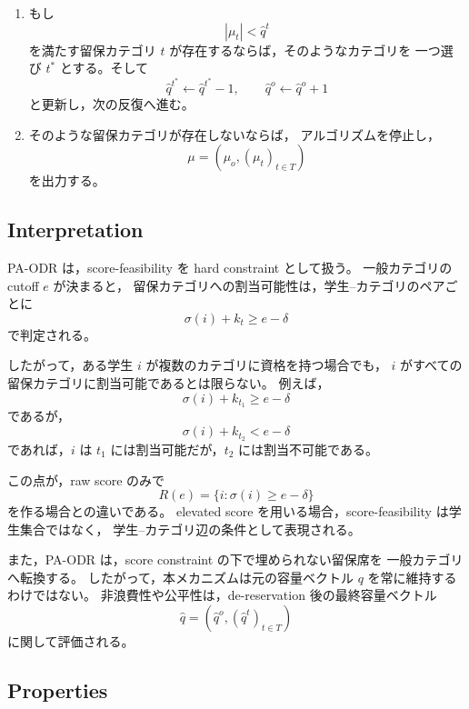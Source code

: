 \documentclass[
  12pt,
  a4paper,
  oneside,
  onecolumn,
  titlepage,
  final
]{jsarticle}
\newcommand{\1}{\mathbf{1}}
\begin{document}
\begin{algorithm}[H]
\begin{enumerate}
\begin{enumerate}
        \item もし
        \[
            |\mu_t|<\hat q^t
        \]
        を満たす留保カテゴリ $t$ が存在するならば，そのようなカテゴリを
        一つ選び $t^\ast$ とする。そして
        \[
            \hat q^{t^\ast}\leftarrow \hat q^{t^\ast}-1,
            \qquad
            \hat q^o\leftarrow \hat q^o+1
        \]
        と更新し，次の反復へ進む。

        \item そのような留保カテゴリが存在しないならば，
        アルゴリズムを停止し，
        \[
            \mu=(\mu_o,(\mu_t)_{t\in T})
        \]
        を出力する。
    \end{enumerate}
\end{enumerate}
\end{algorithm}
\subsection{Interpretation}

\textsc{PA-ODR} は，score-feasibility を hard constraint として扱う。
一般カテゴリの cutoff $e$ が決まると，
留保カテゴリへの割当可能性は，学生--カテゴリのペアごとに
\[
    \sigma(i)+k_t\ge e-\delta
\]
で判定される。

したがって，ある学生 $i$ が複数のカテゴリに資格を持つ場合でも，
$i$ がすべての留保カテゴリに割当可能であるとは限らない。
例えば，
\[
    \sigma(i)+k_{t_1}\ge e-\delta
\]
であるが，
\[
    \sigma(i)+k_{t_2}< e-\delta
\]
であれば，$i$ は $t_1$ には割当可能だが，$t_2$ には割当不可能である。

この点が，raw score のみで
\[
    R(e)=\{i:\sigma(i)\ge e-\delta\}
\]
を作る場合との違いである。
elevated score を用いる場合，score-feasibility は学生集合ではなく，
学生--カテゴリ辺の条件として表現される。

また，\textsc{PA-ODR} は，score constraint の下で埋められない留保席を
一般カテゴリへ転換する。
したがって，本メカニズムは元の容量ベクトル $q$ を常に維持するわけではない。
非浪費性や公平性は，de-reservation 後の最終容量ベクトル
\[
    \hat q=(\hat q^o,(\hat q^t)_{t\in T})
\]
に関して評価される。

\subsection{Properties}
\end{document}
